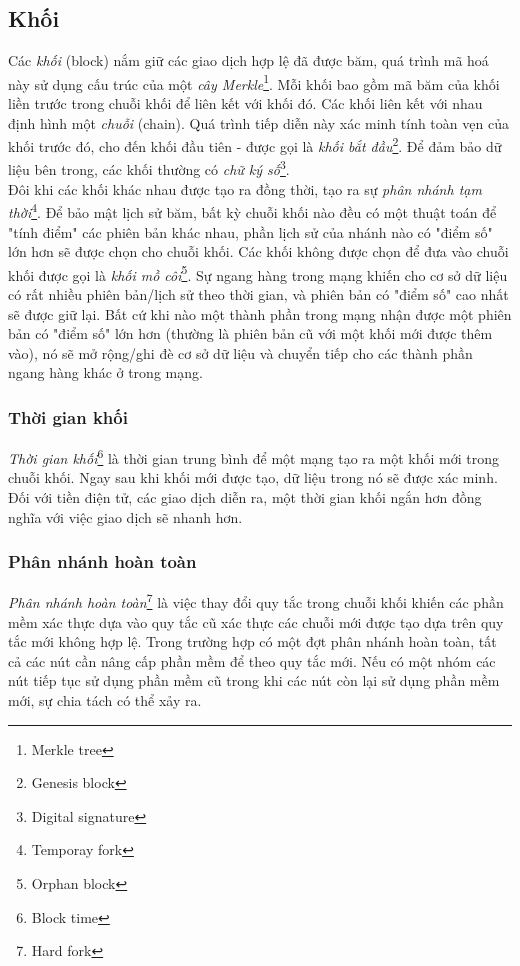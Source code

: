 \subsection{Khối}

Các \textit{khối} (block) nắm giữ các giao dịch hợp lệ đã được băm, quá trình mã hoá này sử dụng cấu trúc của một \textit{cây Merkle}\footnote{Merkle tree}. Mỗi khối bao gồm mã băm của khối liền trước trong chuỗi khối để liên kết với khối đó. Các khối liên kết với nhau định hình một \textit{chuỗi} (chain). Quá trình tiếp diễn này xác minh tính toàn vẹn của khối trước đó, cho đến khối đầu tiên - được gọi là \textit{khối bắt đầu}\footnote{Genesis block}. Để đảm bảo dữ liệu bên trong, các khối thường có \textit{chữ ký số}\footnote{Digital signature}.\\

Đôi khi các khối khác nhau được tạo ra đồng thời, tạo ra sự \textit{phân nhánh tạm thời}\footnote{Temporay fork}. Để bảo mật lịch sử băm, bất kỳ chuỗi khối nào đều có một thuật toán để "tính điểm" các phiên bản khác nhau, phần lịch sử của nhánh nào có "điểm số" lớn hơn sẽ được chọn cho chuỗi khối. Các khối không được chọn để đưa vào chuỗi khối được gọi là \textit{khối mồ côi}\footnote{Orphan block}. Sự ngang hàng trong mạng khiến cho cơ sở dữ liệu có rất nhiều phiên bản/lịch sử theo thời gian, và phiên bản có "điểm số" cao nhất sẽ được giữ lại. Bất cứ khi nào một thành phần trong mạng nhận được một phiên bản có "điểm số" lớn hơn (thường là phiên bản cũ với một khối mới được thêm vào), nó sẽ mở rộng/ghi đè cơ sở dữ liệu và chuyển tiếp cho các thành phần ngang hàng khác ở trong mạng.

\subsubsection{Thời gian khối}
\textit{Thời gian khối}\footnote{Block time} là thời gian trung bình để một mạng tạo ra một khối mới trong chuỗi khối. Ngay sau khi khối mới được tạo, dữ liệu trong nó sẽ được xác minh. Đối với tiền điện tử, các giao dịch diễn ra, một thời gian khối ngắn hơn đồng nghĩa với việc giao dịch sẽ nhanh hơn.

\subsubsection{Phân nhánh hoàn toàn}
\textit{Phân nhánh hoàn toàn}\footnote{Hard fork} là việc thay đổi quy tắc trong chuỗi khối khiến các phần mềm xác thực dựa vào quy tắc cũ xác thực các chuỗi mới được tạo dựa trên quy tắc mới không hợp lệ. Trong trường hợp có một đợt phân nhánh hoàn toàn, tất cả các nút cần nâng cấp phần mềm để theo quy tắc mới. Nếu có một nhóm các nút tiếp tục sử dụng phần mềm cũ trong khi các nút còn lại sử dụng phần mềm mới, sự chia tách có thể xảy ra.

